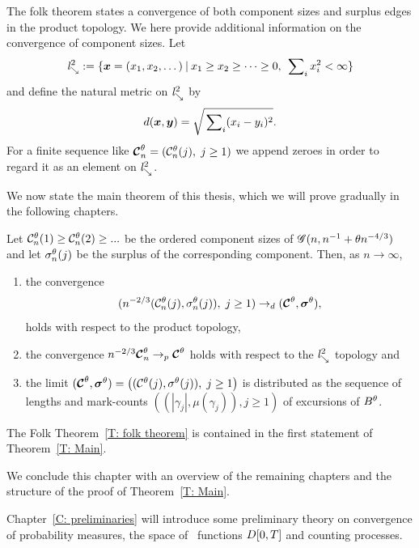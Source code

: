 The folk theorem states a convergence of both component sizes and surplus edges in the product topology.
We here provide additional information on the convergence of component sizes.
Let
\begin{equation}
	\mathit{l}^2_{\searrow} := \{ \boldsymbol{x} = (x_1, x_2, \dots) \: | \: x_1 \geq x_2 \geq \dots \geq 0, \; \sideset{}{_i}\sum x^2_i < \infty \}
\end{equation}
and define the natural metric on $\mathit{l}^2_{\searrow}$ by
\begin{equation}
	d(\boldsymbol{x},\boldsymbol{y}) = \sqrt{\sideset{}{_i}\sum (x_i - y_i)^2}.
\end{equation}
For a finite sequence like $\boldsymbol{\mathcal{C}}^{\theta}_n = (\mathcal{C}^{\theta}_n(j), \; j \geq 1)$ we append zeroes in order to regard it as an element on $\mathit{l}^2_{\searrow}$.


We now state the main theorem of this thesis, which we will prove gradually in the following chapters.
\begin{theorem} \label{T: Main}
	Let $\mathcal{C}^{\theta}_n(1) \geq \mathcal{C}^{\theta}_n(2) \geq ... $ be the ordered component sizes of $\mathscr{G}(n, n^{-1} + \theta n^{-4/3})$
	and let $\mathcal{\sigma}^{\theta}_n(j)$ be the surplus of the corresponding component.
	Then, as $n \rightarrow \infty$,
	\begin{enumerate}
		\item the convergence
		\begin{equation}
		( n^{-2 / 3} ( \mathcal{C}^{\theta}_n(j), \mathcal{\sigma}^{\theta}_n(j) ), \; j \geq 1 ) 
		\rightarrow_d
		( \boldsymbol{\mathcal{C}}^{\theta}, \boldsymbol{\mathcal{\sigma}}^{\theta} ),
		\end{equation}
		holds with respect to the product topology,
		
		\item the convergence $n^{-2 / 3} \boldsymbol{\mathcal{C}}^{\theta}_n \rightarrow_p \boldsymbol{\mathcal{C}}^{\theta}$
		holds with respect to the $\mathit{l}^2_{\searrow}$ topology and
		
		\item the limit
		$( \boldsymbol{\mathcal{C}}^{\theta}, \boldsymbol{\mathcal{\sigma}}^{\theta} ) = \left( ( \mathcal{C}^{\theta}(j), \mathcal{\sigma}^{\theta}(j) ), \; j \geq 1 \right)$
		is distributed as the sequence of lengths and mark-counts
		$ \left( (|\gamma_j|, \mu(\gamma_j)), j \geq 1  \right) $
		of excursions of $B^{\theta}$.
	\end{enumerate}
\end{theorem}
The Folk Theorem~\ref{T: folk theorem} is contained in the first statement of Theorem~\ref{T: Main}.


\bigskip

We conclude this chapter with an overview of the remaining chapters and the structure of the proof of Theorem~\ref{T: Main}.

Chapter~\ref{C: preliminaries} will introduce some preliminary theory on convergence of probability measures,
the space of \cadlag~functions $D[0, T]$ and counting processes.

